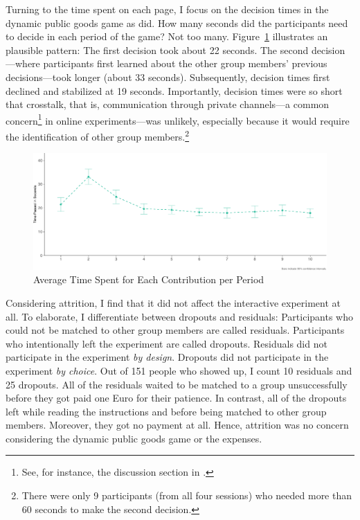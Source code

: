 \documentclass[
  authoryear,
  review,
  3p,
  onecolumn]{elsarticle}
\begin{document}
Turning to the time spent on each page, I focus on the decision times in
the dynamic public goods game as \citet{Anderhub2001} did. How many
seconds did the participants need to decide in each period of the game?
Not too many. Figure~\ref{fig-time-spent} illustrates an plausible
pattern: The first decision took about 22 seconds. The second
decision---where participants first learned about the other group
members' previous decisions---took longer (about 33 seconds).
Subsequently, decision times first declined and stabilized at 19
seconds. Importantly, decision times were so short that crosstalk, that
is, communication through private channels---a common concern\footnote{See,
  for instance, the discussion section in \citet[p.~119]{AGM2018}.} in
online experiments---was unlikely, especially because it would require
the identification of other group members.\footnote{There were only 9
  participants (from all four sessions) who needed more than 60 seconds
  to make the second decision.}

\begin{figure}

{\centering \includegraphics{paper_files/figure-pdf/fig-time-spent-1.pdf}

}

\caption{\label{fig-time-spent}Average Time Spent for Each Contribution
per Period}

\end{figure}

Considering attrition, I find that it did not affect the interactive
experiment at all. To elaborate, I differentiate between dropouts and
residuals: Participants who could not be matched to other group members
are called residuals. Participants who intentionally left the experiment
are called dropouts. Residuals did not participate in the experiment
\emph{by design}. Dropouts did not participate in the experiment
\emph{by choice}. Out of 151 people who showed up, I count 10 residuals
and 25 dropouts. All of the residuals waited to be matched to a group
unsuccessfully before they got paid one Euro for their patience. In
contrast, all of the dropouts left while reading the instructions and
before being matched to other group members. Moreover, they got no
payment at all. Hence, attrition was no concern considering the dynamic
public goods game or the expenses.
\end{document}
